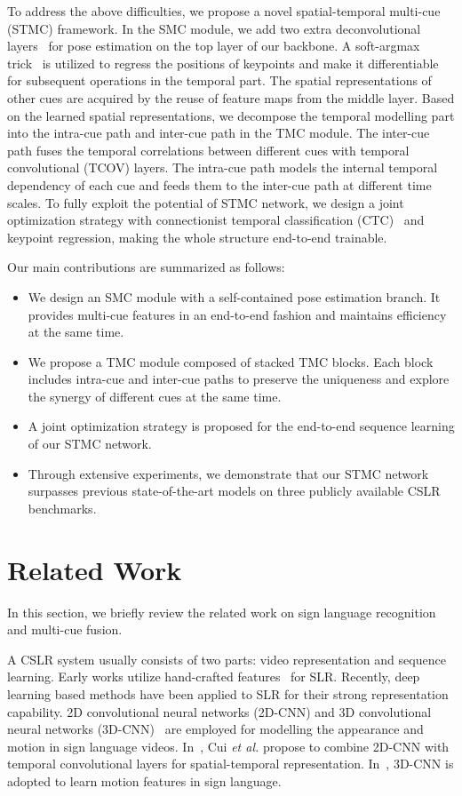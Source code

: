 \documentclass[letterpaper]{article} \usepackage{aaai20}  \usepackage{times}  \usepackage{helvet} \usepackage{courier}  \usepackage[hyphens]{url}  \usepackage{graphicx} \urlstyle{rm} \def\UrlFont{\rm}  \usepackage{graphicx}  \frenchspacing  \setlength{\pdfpagewidth}{8.5in}  \setlength{\pdfpageheight}{11in}
\begin{document}
To address the above difficulties, we propose a novel spatial-temporal multi-cue (STMC) framework. 
In the SMC module, we add two extra deconvolutional layers~\cite{deconv,xiao2018simple} for pose estimation on the top layer of our backbone. 
A soft-argmax trick~\cite{soft-argmax} is utilized to regress the positions of keypoints and make it differentiable for subsequent operations in the temporal part. 
The spatial representations of other cues are acquired by the reuse of feature maps from the middle layer. 
Based on the learned spatial representations, we decompose the temporal modelling part into the intra-cue path and inter-cue path in the TMC module. 
The inter-cue path fuses the temporal correlations between different cues with temporal convolutional (TCOV) layers. 
The intra-cue path models the internal temporal dependency of each cue and feeds them to the inter-cue path at different time scales.  
To fully exploit the potential of STMC network, we design a joint optimization strategy with connectionist temporal classification (CTC)~\cite{CTC} and keypoint regression, making the whole structure end-to-end trainable.


Our main contributions are summarized as follows:
\begin{itemize}
\item We design an SMC module with a self-contained pose estimation branch. It provides multi-cue features in an end-to-end fashion and maintains efficiency at the same time.
\item We propose a TMC module composed of stacked TMC blocks. Each block includes intra-cue and inter-cue paths to preserve the uniqueness and explore the synergy of different cues at the same time.
\item A joint optimization strategy is proposed for the end-to-end sequence learning of our STMC network. 
\item Through extensive experiments, we demonstrate that our STMC network surpasses previous state-of-the-art models on three publicly available CSLR benchmarks. 
\end{itemize}


\section{Related Work}
In this section, we briefly review the related work on sign language recognition and multi-cue fusion.

A CSLR system usually consists of two parts: video representation and sequence learning. Early works utilize 
hand-crafted features~\cite{cooper2009learning,buehler2009learning,yin2016iterative} for SLR. 
Recently, deep learning based methods have been applied to SLR for their strong representation capability. 2D 
convolutional neural networks (2D-CNN) and 3D convolutional neural networks (3D-CNN)~\cite{yukai3d,qiu2017learning-p3d} are employed for modelling the appearance and motion in sign language videos. In~\cite{staged}, Cui \textit{et al.} propose to combine 2D-CNN with temporal convolutional layers for spatial-temporal representation. In~\cite{molchanov2016online,dilated,zhou2019dynamic,wei2019bigmm}, 3D-CNN is adopted to learn motion features in sign language.
\end{document}
